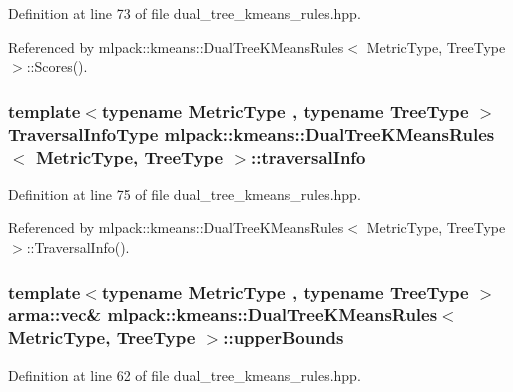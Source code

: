 Definition at line 73 of file dual\+\_\+tree\+\_\+kmeans\+\_\+rules.\+hpp.



Referenced by mlpack\+::kmeans\+::\+Dual\+Tree\+K\+Means\+Rules$<$ Metric\+Type, Tree\+Type $>$\+::\+Scores().

\subsubsection[{traversal\+Info}]{\setlength{\rightskip}{0pt plus 5cm}template$<$typename Metric\+Type , typename Tree\+Type $>$ {\bf Traversal\+Info\+Type} {\bf mlpack\+::kmeans\+::\+Dual\+Tree\+K\+Means\+Rules}$<$ Metric\+Type, Tree\+Type $>$\+::traversal\+Info\hspace{0.3cm}{\ttfamily [private]}}\label{classmlpack_1_1kmeans_1_1DualTreeKMeansRules_a595c55bd18dbdb3fdcc9583893b4b15e}


Definition at line 75 of file dual\+\_\+tree\+\_\+kmeans\+\_\+rules.\+hpp.



Referenced by mlpack\+::kmeans\+::\+Dual\+Tree\+K\+Means\+Rules$<$ Metric\+Type, Tree\+Type $>$\+::\+Traversal\+Info().

\subsubsection[{upper\+Bounds}]{\setlength{\rightskip}{0pt plus 5cm}template$<$typename Metric\+Type , typename Tree\+Type $>$ arma\+::vec\& {\bf mlpack\+::kmeans\+::\+Dual\+Tree\+K\+Means\+Rules}$<$ Metric\+Type, Tree\+Type $>$\+::upper\+Bounds\hspace{0.3cm}{\ttfamily [private]}}\label{classmlpack_1_1kmeans_1_1DualTreeKMeansRules_a8255a45ad2481091f594933a7f73b33f}


Definition at line 62 of file dual\+\_\+tree\+\_\+kmeans\+\_\+rules.\+hpp.

